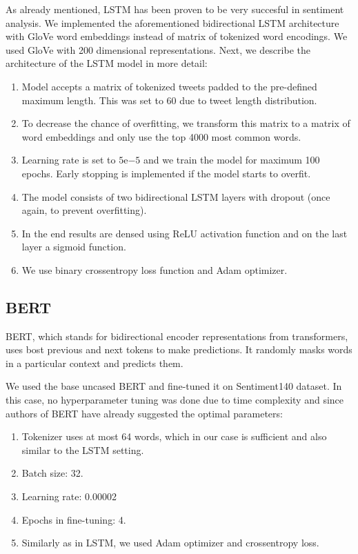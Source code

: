 \documentclass[conference]{IEEEtran}
\begin{document}
As already mentioned, LSTM has been proven to be very succesful in sentiment analysis. We implemented the aforementioned bidirectional LSTM architecture with GloVe word embeddings instead of matrix of tokenized word encodings. We used GloVe with 200 dimensional representations. Next, we describe the architecture of the LSTM model in more detail:
\begin{enumerate}
	\item Model accepts a matrix of tokenized tweets padded to the pre-defined maximum length. This was set to 60 due to tweet length distribution.
	\item To decrease the chance of overfitting, we transform this matrix to a matrix of word embeddings and only use the top 4000 most common words.
	\item Learning rate is set to $5\mathrm{e}{-5}$ and we train the model for maximum 100 epochs. Early stopping is implemented if the model starts to overfit.
	\item The model consists of two bidirectional LSTM layers with dropout (once again, to prevent overfitting).
	\item In the end results are densed using ReLU activation function and on the last layer a sigmoid function.
	\item We use binary crossentropy loss function and Adam optimizer.
\end{enumerate}

\subsection{BERT}
BERT, which stands for bidirectional encoder representations from transformers, uses bost previous and next tokens to make predictions. It randomly masks words in a particular context and predicts them.

We used the base uncased BERT and fine-tuned it on Sentiment140 dataset. In this case, no hyperparameter tuning was done due to time complexity and since authors of BERT have already suggested the optimal parameters:
\begin{enumerate}
	\item Tokenizer uses at most 64 words, which in our case is sufficient and also similar to the LSTM setting.
	\item Batch size: 32.
	\item Learning rate: 0.00002
	\item Epochs in fine-tuning: 4.
	\item Similarly as in LSTM, we used Adam optimizer and crossentropy loss.
\end{enumerate}
\end{document}
